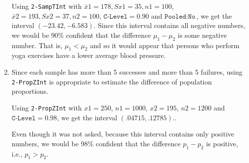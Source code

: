 \documentclass{article}
\newcommand{\answer}[1]{{\color{red}{\large \textbf{#1}}}}
\begin{document}
\begin{enumerate}
Using \texttt{2-SampTInt} with $\bar{x}1 = 178, Sx1 = 35, n1=100$, $\bar{x}2=193, Sx2=37, n2=100$, $\texttt{C-Level}=0.90$ and $\texttt{Pooled}: \texttt{No}$, we get the interval $(-23.42, -6.583)$. Since this interval contains all negative numbers, we would be 90\% confident that the difference $\mu_1 - \mu_2$ is some negative number. That is, $\mu_1 < \mu_2$ and so it would appear that persons who perform yoga exercises have a lower average blood pressure.

\item \answer{D} Since each sample has more than 5 successes and more than 5 failures, using \texttt{2-PropZInt} is appropriate to estimate the difference of population proportions.

Using \texttt{2-PropZInt} with $x1 = 250$, $n1=1000$, $x2=195$, $n2=1200$ and $\texttt{C-Level}=0.98$, we get the interval $(.04715, .12785).$. 

Even though it was not asked, because this interval contains only positive numbers, we would be 98\% confident that the difference $p_1-p_2$ is positive, i.e., $p_1 > p_2$.

\end{enumerate}
\end{document}
